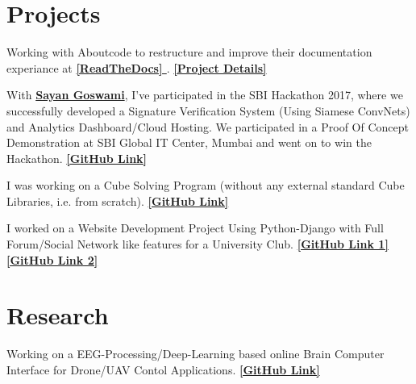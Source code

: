 \documentclass[]{deedy-resume-openfont}
\begin{document}
\hfill
\begin{minipage}[t]{0.66\textwidth} 


\section{Projects}

Working with Aboutcode to restructure and improve their documentation experiance at \textbf{\href{https://aboutcode.readthedocs.io}{ [ReadTheDocs] }}.   \textbf{\href{https://developers.google.com/season-of-docs/docs/participants/project-aboutcode}{ [Project Details] }}
\sectionsep


With \textbf{\href{https://github.com/Sayan98}{Sayan Goswami}}, I've participated in the SBI Hackathon 2017, where we successfully developed a Signature Verification System (Using Siamese ConvNets) and Analytics Dashboard/Cloud Hosting. We participated in a Proof Of Concept Demonstration at SBI Global IT Center, Mumbai and went on to win the Hackathon. \textbf{\href{https://github.com/AyanSinhaMahapatra/AutoSIGN}{ [GitHub Link] }}
\sectionsep

I was working on a Cube Solving Program (without any external standard Cube Libraries, i.e. from scratch). \textbf{\href{https://github.com/AyanSinhaMahapatra/CubeSolving}{ [GitHub Link] }}
\sectionsep

I worked on a Website Development Project Using Python-Django with Full Forum/Social Network like features for a University Club. 
\textbf{\href{https://github.com/AyanSinhaMahapatra/Univnet_Beta}{ [GitHub Link 1] }} \textbf{\href{https://github.com/AyanSinhaMahapatra/AnswerIt}{ [GitHub Link 2] }}
\sectionsep


\section{Research}
Working on a EEG-Processing/Deep-Learning based online Brain Computer Interface for Drone/UAV Contol Applications. 
\textbf{\href{https://github.com/AyanSinhaMahapatra/bci-nal}{ [GitHub Link] }}
\sectionsep


\end{minipage}
\end{document}
